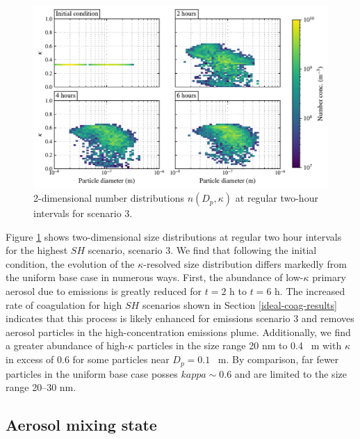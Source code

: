 \begin{figure}[!t]
  \centering
    \includegraphics[width=\textwidth]{figures/chapter5/2d-kappa-dist-4-panel-point-source-1x1-z40.pdf}
    \caption{2-dimensional number distributions $n(D_p, \kappa)$ at regular two-hour intervals for scenario 3.}
    \label{fig:2d-kappa-dist-s3}
\end{figure}

Figure \ref{fig:2d-kappa-dist-s3} shows two-dimensional size distributions at regular two hour intervals for the highest $SH$ scenario, scenario 3. We find that following the initial condition, the evolution of the $\kappa$-resolved size distribution differs markedly from the uniform base case in numerous ways. First, the abundance of low-$\kappa$ primary aerosol due to emissions is greatly reduced for $t=2$ h to $t=6$ h. The increased rate of coagulation for high $SH$ scenarios shown in Section \ref{ideal-coag-results} indicates that this process is likely enhanced for emissions scenario 3 and removes aerosol particles in the high-concentration emissions plume. Additionally, we find a greater abundance of high-$\kappa$ particles in the size range 20 nm to 0.4 \si{\mu m} with $\kappa$ in excess of 0.6 for some particles near $D_p=0.1$ \si{\mu m}. By comparison, far fewer particles in the uniform base case posses $kappa\sim0.6$ and are limited to the size range 20--30 nm. 

\subsection{Aerosol mixing state}

